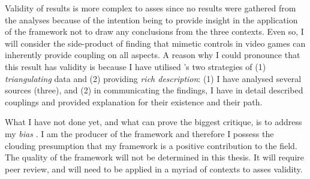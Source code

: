 Validity of results is more complex to asses since no results were gathered from the analyses because of the intention being to provide insight in the application of the framework not to draw any conclusions from the three contexts. Even so, I will consider the side-product of finding that mimetic controls in video games can inherently provide coupling on all aspects. A reason why I could pronounce that this result has validity is because I have utilised \citeauthor{cresswell}'s \citeyear{cresswell} two strategies of (1) \textit{triangulating} data and (2) providing \textit{rich description}: (1) I have analysed several sources (three), and (2) in communicating the findings, I have in detail described couplings and provided explanation for their existence and their path.

What I have not done yet, and what can prove the biggest critique, is to address my \textit{bias} \cite{cresswell}. I am the producer of the framework and therefore I possess the clouding presumption that my framework is a positive contribution to the field. The quality of the framework will not be determined in this thesis. It will require peer review, and will need to be applied in a myriad of contexts to asses validity.
